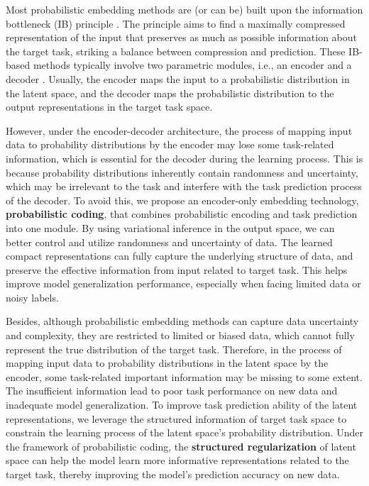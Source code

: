 \documentclass[letterpaper]{article} %
\begin{document}
Most probabilistic embedding methods \cite{DBLP:journals/corr/KingmaW13,DBLP:conf/iclr/AlemiFD017, DBLP:conf/iclr/HigginsMPBGBML17,DBLP:journals/entropy/Fischer20,DBLP:conf/cvpr/AnJC23} are (or can be) built upon the information bottleneck (IB) principle \cite{tishby1999information,tishby2015deep}.
The principle aims to find a maximally compressed representation of the input that preserves as much as possible information about the target task, striking a balance between compression and prediction.
These IB-based methods typically involve two parametric modules, i.e., an encoder and a decoder \cite{DBLP:journals/jsait/GoldfeldP20}. 
Usually, the encoder maps the input to a probabilistic distribution in the latent space, and the decoder maps the probabilistic distribution to the output representations in the target task space.


However, under the encoder-decoder architecture, the process of mapping input data to probability distributions by the encoder may lose some task-related information, which is essential for the decoder during the learning process. This is because probability distributions inherently contain randomness and uncertainty, which may be irrelevant to the task and interfere with the task prediction process of the decoder.
To avoid this, we propose an encoder-only embedding technology, \textbf{probabilistic coding}, that combines probabilistic encoding and task prediction into one module.
By using variational inference in the output space, we can better control and utilize randomness and uncertainty of data. 
The learned compact representations can fully capture the underlying structure of data, and preserve the effective information from input related to target task.
This helps improve model generalization performance, especially when facing limited data or noisy labels.


Besides, although probabilistic embedding methods can capture data uncertainty and complexity, they are restricted to limited or biased data, which cannot fully represent the true distribution of the target task. Therefore, in the process of mapping input data to probability distributions in the latent space by the encoder, some task-related important information may be missing to some extent.
The insufficient information lead to poor task performance on new data and  inadequate model generalization.
To improve task prediction ability of the latent representations, 
we leverage the structured information of target task space to 
constrain the learning process of the latent space's probability distribution. 
Under the framework of probabilistic coding, the \textbf{structured regularization} of latent space can help the model learn more informative representations related to the target task, thereby improving the model's prediction accuracy on new data.
\end{document}
